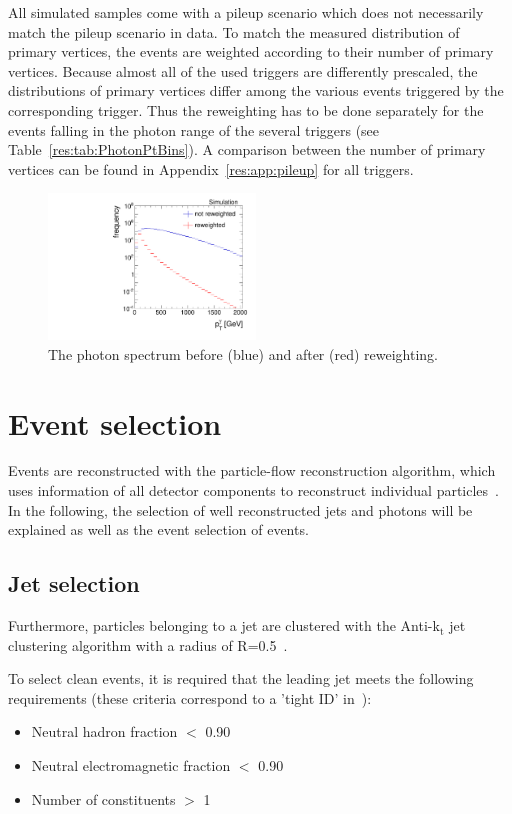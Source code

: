 All simulated samples come with a pileup scenario which does not necessarily match the pileup scenario in data. 
To match the measured distribution of primary vertices, the events are weighted according to their number of primary vertices. 
Because almost all of the used triggers are differently prescaled, the distributions of primary vertices differ among the various events triggered by the corresponding trigger.
Thus the reweighting has to be done separately for the events falling in the photon \pt range of the several triggers (see Table~\ref{res:tab:PhotonPtBins}).
A comparison between the number of primary vertices can be found in Appendix~\ref{res:app:pileup} for all triggers.
\begin{figure}[ht]
  \centering
      \includegraphics[width=0.49\textwidth]{figures/resolution/eventSelection/PhotonPtComparison_reweighted.pdf} 
  \caption{The photon \pt spectrum before (blue) and after (red) reweighting.}  
  \label{res:fig:PhotonPtSpectrum}
\end{figure}


\section{Event selection}
\label{res:sec:EventSelection}
Events are reconstructed with the particle-flow reconstruction algorithm, which uses information of all detector components to reconstruct individual particles~\cite{CMS-PAS-PFT-09-001}.
In the following, the selection of well reconstructed jets and photons will be explained as well as the event selection of \GAMJET events.

\subsection{Jet selection}
Furthermore, particles belonging to a jet are clustered with the Anti-k$_{\text{t}}$ jet clustering algorithm with a radius of R=0.5~\cite{Cacciari:2008gp}.

To select clean \GAMJET events, it is required that the leading jet meets the following requirements (these criteria correspond to a 'tight ID' in~\cite{bib:JetIDRecommendation_7TeV,bib:AN:JetId_8TeV}):
\begin{itemize}

 \item Neutral hadron fraction $<$ 0.90
 \item Neutral electromagnetic fraction $<$ 0.90
 \item Number of constituents $>$ 1
\end{itemize}

